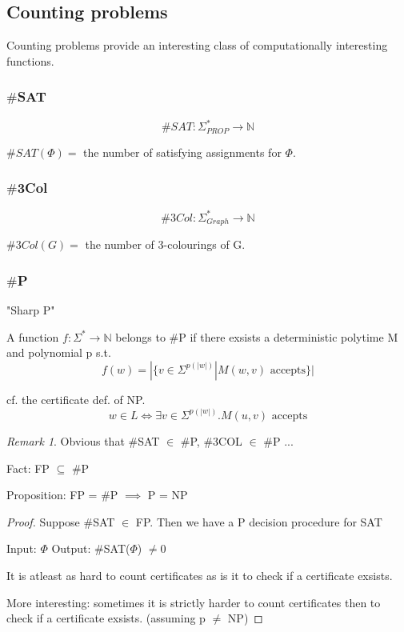 \documentclass[a4paper,12pt]{article}
\theoremstyle{definition}
\theoremstyle{remark}
\newtheorem*{remark}{Remark}
\newcommand{\N}{\mathbb{N}}
\begin{document}
\subsection{Counting problems}
Counting problems provide an interesting class of computationally interesting functions.

\subsubsection{$\#$SAT}
\begin{equation*}
    \#SAT: \Sigma_{PROP}^* \to \N
\end{equation*}

$\#SAT(\Phi) =$ the number of satisfying assignments for $\Phi$.

\subsubsection{$\#$3Col}
\begin{equation*}
    \#3Col: \Sigma_{Graph}^* \to \N
\end{equation*}

$\#3Col(G) =$ the number of 3-colourings of G.

\subsubsection{$\#$P}
"Sharp P"

A function $f: \Sigma^* \to \N$ belongs to $\#$P if there exsists a deterministic polytime M
and polynomial p s.t.
\begin{equation*}
    f(w) = |\{v \in \Sigma^{p(|w|)} | M(w, v) \text{ accepts}\}|
\end{equation*}

cf. the certificate def. of NP.
\begin{equation*}
    w \in L \iff \exists v \in \Sigma^{p(|w|)} . M(u, v) \text{ accepts}
\end{equation*}

\begin{remark}
    Obvious that $\#$SAT $\in$ $\#$P, $\#$3COL $\in$ $\#$P ...
\end{remark}

Fact: FP $\subseteq$ $\#$P

Proposition: FP = $\#$P $\implies$ P = NP

\begin{proof}
    Suppose $\#$SAT $\in$ FP. Then we have a P decision procedure for SAT

    Input: $\Phi$
    Output: $\#$SAT($\Phi$) $\neq 0$

    It is atleast as hard to count certificates as is it to check if a certificate exsists.

    More interesting:
    sometimes it is strictly harder to count certificates then to check if a certificate exsists. (assuming p $\neq$ NP)
\end{proof}
\end{document}
